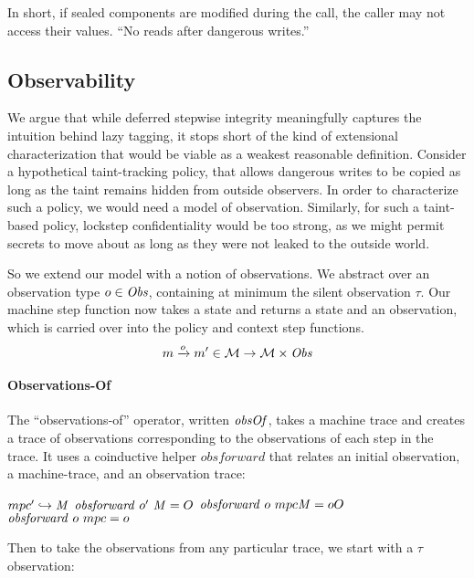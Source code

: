 \documentclass[acmsmall,review,anonymous]{acmart}\settopmatter{printfolios=true,printccs=false,printacmref=false}
\begin{document}
In short, if sealed components are modified during the call, the caller may not
access their values. ``No reads after dangerous writes.''

\subsection{Observability}

We argue that while deferred stepwise integrity meaningfully captures the intuition
behind lazy tagging, it stops short of the kind of extensional characterization
that would be viable as a weakest reasonable definition. Consider a hypothetical
taint-tracking policy, that allows dangerous writes to be copied as long as the
taint remains hidden from outside observers. In order to characterize
such a policy, we would need a model of observation.
Similarly, for such a taint-based policy, lockstep confidentiality would be too
strong, as we might permit secrets to move about as long as they were not
leaked to the outside world.

So we extend our model with a notion of observations. We abstract over an
observation type \(\obs \in \OBSS\), containing at minimum the silent observation
\(\tau\). Our machine step function now takes a state and returns a state and an observation,
which is carried over into the policy and context step functions.
%
\[\mach \stepsto[\obs] \mach' \in \MACHS \rightarrow \MACHS \times \OBSS \]
%

\paragraph*{Observations-Of}

The ``observations-of'' operator, written \(\obsof\), takes a machine trace and
creates a trace of observations corresponding to the observations of each step in
the trace. It uses a coinductive helper \(\mathit{obsforward}\) that relates an
initial observation, a machine-trace, and an observation trace:

              {\(\mpcstatename' \hookrightarrow \MPCT\)}
              {\(\mathit{obsforward} ~ \obs' ~ \MPCT = \obsT\)}
              {\(\mathit{obsforward} ~ \obs ~ \mpcstatename \MPCT = \obs\obsT\)}%
\judgment{}
         {\(\mathit{obsforward} ~ \obs ~ \mpcstatename = \obs\)}

Then to take the observations from any particular trace, we start with a \(\tau\) observation:
\end{document}
